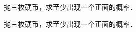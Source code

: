 \documentclass[lang=cn,newtx,10pt,scheme=chinese]{elegantbook}
\begin{document}
\begin{problemset}[习题 1.2]
    \item 抛三枚硬币，求至少出现一个正面的概率．
    \begin{solution}
        \begin{framed}
            
        \end{framed}
    \end{solution}

    \item 抛三枚硬币，求至少出现一个正面的概率．
    \begin{solution}
        \begin{framed}
            
        \end{framed}
    \end{solution}
\end{problemset}
\end{document}
